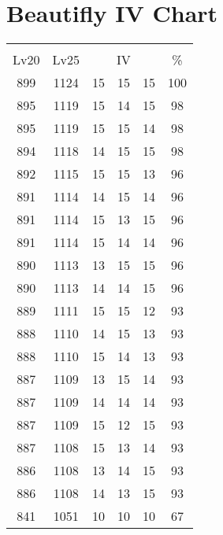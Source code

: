 \documentclass{article}%
\begin{document}
%
\normalsize%
\section{Beautifly IV Chart}%
\label{sec:Beautifly IV Chart}%
\renewcommand{\arraystretch}{1.5}%
\begin{tabular}{|c|c|c|c|c|c|}%
\hline%
\multicolumn{6}{|c|}{\textcolor{white}{ 
\linebreak{Beautifly}
}%
\cellcolor{black}}\\%
\multicolumn{1}{|c}{Lv20}&\multicolumn{1}{c|}{Lv25}&\multicolumn{3}{c|}{IV}&\multicolumn{1}{|c|}{\%}\\%
\hline%
\rowcolor{color100}%
899&1124&15&15&15&100\\%
\hline%
\rowcolor{color98}%
895&1119&15&14&15&98\\%
\hline%
\rowcolor{color98}%
895&1119&15&15&14&98\\%
\hline%
\rowcolor{color98}%
894&1118&14&15&15&98\\%
\hline%
\rowcolor{color96}%
892&1115&15&15&13&96\\%
\hline%
\rowcolor{color96}%
891&1114&14&15&14&96\\%
\hline%
\rowcolor{color96}%
891&1114&15&13&15&96\\%
\hline%
\rowcolor{color96}%
891&1114&15&14&14&96\\%
\hline%
\rowcolor{color96}%
890&1113&13&15&15&96\\%
\hline%
\rowcolor{color96}%
890&1113&14&14&15&96\\%
\hline%
\rowcolor{color93}%
889&1111&15&15&12&93\\%
\hline%
\rowcolor{color93}%
888&1110&14&15&13&93\\%
\hline%
\rowcolor{color93}%
888&1110&15&14&13&93\\%
\hline%
\rowcolor{color93}%
887&1109&13&15&14&93\\%
\hline%
\rowcolor{color93}%
887&1109&14&14&14&93\\%
\hline%
\rowcolor{color93}%
887&1109&15&12&15&93\\%
\hline%
\rowcolor{color93}%
887&1108&15&13&14&93\\%
\hline%
\rowcolor{color93}%
886&1108&13&14&15&93\\%
\hline%
\rowcolor{color93}%
886&1108&14&13&15&93\\%
\hline%
\rowcolor{color91}%
841&1051&10&10&10&67\\%
\end{tabular}

%
\end{document}
